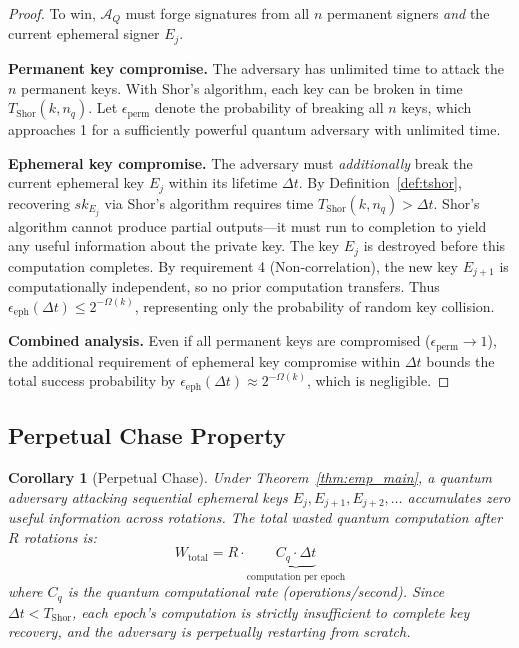 \documentclass[12pt, a4paper, twocolumn]{article}
\newtheorem{corollary}{Corollary}
\begin{document}
\begin{proof}
To win, $\mathcal{A}_Q$ must forge signatures from all $n$ permanent signers \emph{and} the current ephemeral signer $E_j$.

\textbf{Permanent key compromise.} The adversary has unlimited time to attack the $n$ permanent keys. With Shor's algorithm, each key can be broken in time $T_{\text{Shor}}(k, n_q)$. Let $\epsilon_{\text{perm}}$ denote the probability of breaking all $n$ keys, which approaches 1 for a sufficiently powerful quantum adversary with unlimited time.

\textbf{Ephemeral key compromise.} The adversary must \emph{additionally} break the current ephemeral key $E_j$ within its lifetime $\Delta t$. By Definition~\ref{def:tshor}, recovering $sk_{E_j}$ via Shor's algorithm requires time $T_{\text{Shor}}(k, n_q) > \Delta t$. Shor's algorithm cannot produce partial outputs---it must run to completion to yield any useful information about the private key. The key $E_j$ is destroyed before this computation completes. By requirement 4 (Non-correlation), the new key $E_{j+1}$ is computationally independent, so no prior computation transfers. Thus $\epsilon_{\text{eph}}(\Delta t) \leq 2^{-\Omega(k)}$, representing only the probability of random key collision.

\textbf{Combined analysis.} Even if all permanent keys are compromised ($\epsilon_{\text{perm}} \to 1$), the additional requirement of ephemeral key compromise within $\Delta t$ bounds the total success probability by $\epsilon_{\text{eph}}(\Delta t) \approx 2^{-\Omega(k)}$, which is negligible.
\end{proof}

\subsection{Perpetual Chase Property}

\begin{corollary}[Perpetual Chase]
\label{cor:chase}
Under Theorem~\ref{thm:emp_main}, a quantum adversary attacking sequential ephemeral keys $E_{j}, E_{j+1}, E_{j+2}, \ldots$ accumulates zero useful information across rotations. The total wasted quantum computation after $R$ rotations is:
\[
W_{\text{total}} = R \cdot \underbrace{C_q \cdot \Delta t}_{\text{computation per epoch}}
\]
where $C_q$ is the quantum computational rate (operations/second). Since $\Delta t < T_{\text{Shor}}$, each epoch's computation is strictly insufficient to complete key recovery, and the adversary is perpetually restarting from scratch.
\end{corollary}
\end{document}
